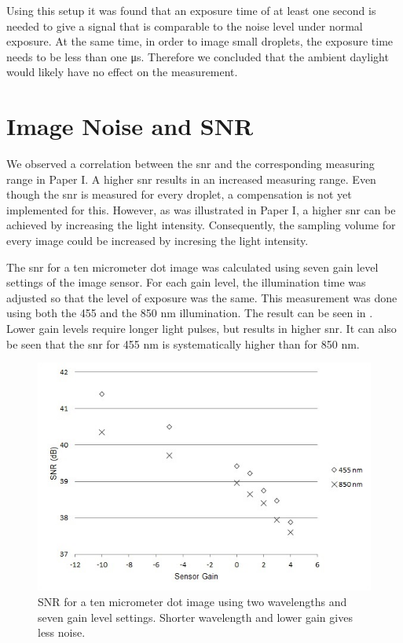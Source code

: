 Using this setup it was found that an exposure time of at least one second is needed to give a signal that is comparable to the noise level under normal exposure. At the same time, in order to image small droplets, the exposure time needs to be less than one μs. Therefore we concluded that the ambient daylight would likely have no effect on the measurement.

\section{Image Noise and SNR}
\label{sec:discnoise}
We observed a correlation between the \gls{snr} and the corresponding measuring range in Paper I. A higher \gls{snr} results in an increased measuring range. Even though the \gls{snr} is measured for every droplet, a compensation is not yet implemented for this. However, as was illustrated in Paper I, a higher \gls{snr} can be achieved by increasing the light intensity. Consequently, the sampling volume for every image could be increased by incresing the light intensity. 

The \gls{snr} for a ten micrometer dot image was calculated using seven gain level settings of the image sensor. For each gain level, the illumination time was adjusted so that the level of exposure was the same. This measurement was done using both the 455 and the 850 nm illumination. The result can be seen in . Lower gain levels require longer light pulses, but results in higher \gls{snr}. It can also be seen that the \gls{snr} for 455 nm is systematically higher than for 850 nm. 

\begin{figure}%
\centering\includegraphics[width=0.6\linewidth]{figures/NoiseGain}
\caption{SNR for a ten micrometer dot image using two wavelengths and seven gain level settings. Shorter wavelength and lower gain gives less noise.}
\label{fig:noisegain}
\end{figure}

